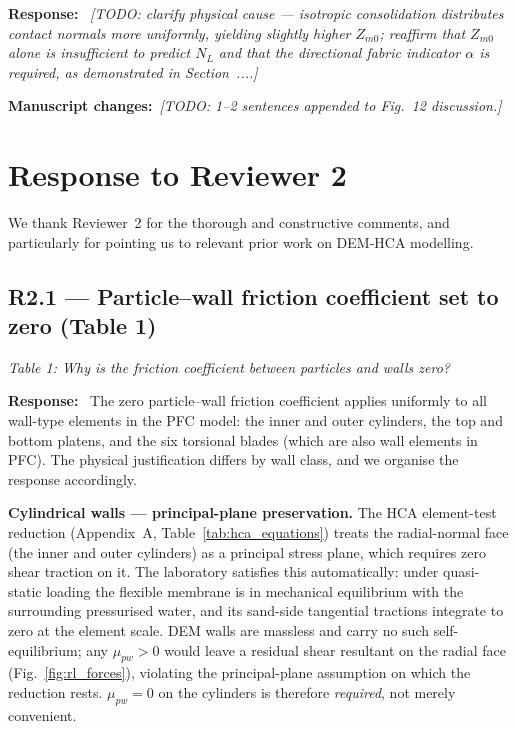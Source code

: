 \documentclass[11pt,a4paper]{article}
\newenvironment{rcomment}
  {\begin{leftbar}\color{black!75}\itshape}
  {\end{leftbar}\vspace{0.3em}}
\newcommand{\response}{\par\noindent\textbf{Response:}\ \ignorespaces}
\newcommand{\changed}[1]{\par\noindent\textbf{Manuscript changes:}\ #1\par}
\newcommand{\secref}[1]{Section~#1}
\newcommand{\figref}[1]{Fig.~#1}
\newcommand{\Zmz}{\ensuremath{Z_{m0}}}
\begin{document}
\response
\textit{[TODO: clarify physical cause --- isotropic consolidation distributes
contact normals more uniformly, yielding slightly higher $\Zmz$; reaffirm
that $\Zmz$ alone is insufficient to predict $N_L$ and that the directional
fabric indicator $\alpha$ is required, as demonstrated in
\secref{...}.]}

\changed{\textit{[TODO: 1--2 sentences appended to \figref{12} discussion.]}}

\clearpage


\section*{Response to Reviewer 2}

We thank Reviewer~2 for the thorough and constructive comments, and
particularly for pointing us to relevant prior work on DEM-HCA modelling.

\subsection*{R2.1 --- Particle--wall friction coefficient set to zero (Table 1)}

\begin{rcomment}
Table 1: Why is the friction coefficient between particles and walls zero?
\end{rcomment}

\response
The zero particle--wall friction coefficient applies uniformly to all
wall-type elements in the PFC model: the inner and outer
cylinders, the top and bottom platens, and the six torsional blades
(which are also wall elements in PFC). The physical justification
differs by wall class, and we organise the response accordingly.

\medskip
\noindent\textbf{Cylindrical walls --- principal-plane preservation.}
The HCA element-test reduction (Appendix~A,
Table~\ref{tab:hca_equations}) treats the radial-normal face (the
inner and outer cylinders) as a principal stress plane, which
requires zero shear traction on it. The laboratory satisfies this
automatically: under quasi-static loading the flexible membrane is
in mechanical equilibrium with the surrounding pressurised water,
and its sand-side tangential tractions integrate to zero at the
element scale. DEM walls are massless and carry no such
self-equilibrium; any $\mu_{pw}>0$ would leave a residual shear
resultant on the radial face (Fig.~\ref{fig:rl_forces}), violating
the principal-plane assumption on which the reduction rests.
$\mu_{pw}=0$ on the cylinders is therefore \emph{required}, not
merely convenient.
\end{document}
